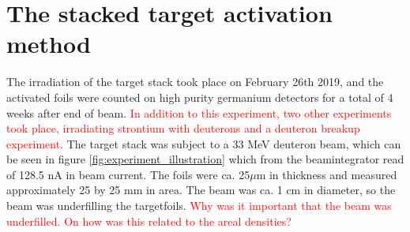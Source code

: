 


\section{The stacked target activation method} \label{sec:experiment}
The irradiation of the target stack took place on February 26th 2019, and the activated foils were counted on high purity germanium detectors for a total of 4 weeks after end of beam. \textcolor{red}{In addition to this experiment, two other experiments took place, irradiating strontium with deuterons and a deuteron breakup experiment}. The target stack was subject to a 33 MeV deuteron beam, which can be seen in figure \ref{fig:experiment_illustration} which from the beamintegrator read of 128.5 nA in beam current. The foils were ca. 25$\mu$m in thickness and measured approximately 25 by 25 mm in area. The beam was ca. 1 cm in diameter, so the beam was underfilling the targetfoils. \textcolor{red}{Why was it important that the beam was underfilled. On how was this related to the areal densities?}  \\

